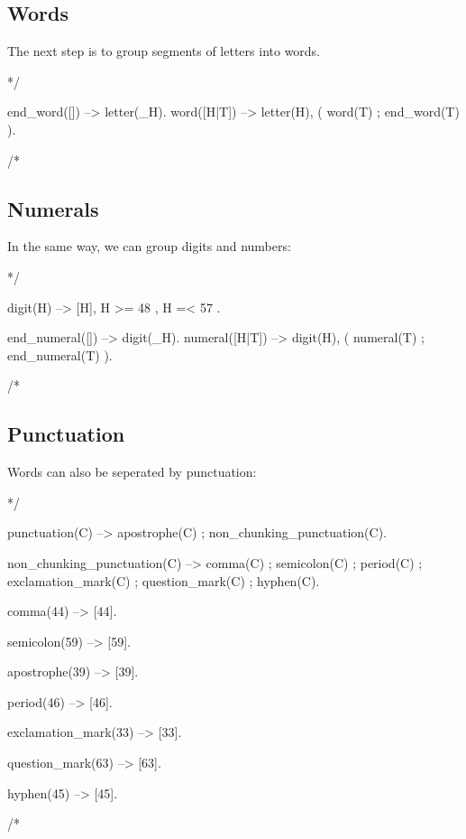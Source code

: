 \documentclass{book}[9pt]
\newenvironment{code}%
{\small \verbatim}%
{\endverbatim \large}
\begin{document}
\subsection{Words}

The next step is to group segments of letters into words.

\begin{code}
*/

end_word([]) --> \+ letter(_H).
word([H|T]) -->
        letter(H),
        ( word(T)
        ; end_word(T)
        ).


/*
\end{code}

\subsection{Numerals}

In the same way, we can group digits and numbers:

\begin{code}
*/

digit(H) -->
        [H],
        { H >= 48 },
        { H =< 57 }.

end_numeral([]) --> \+ digit(_H).
numeral([H|T]) -->
        digit(H),
        (
          numeral(T)
        ;
          end_numeral(T)
        ).

/*
\end{code}

\subsection{Punctuation}

Words can also be seperated by punctuation:

\begin{code}
*/

punctuation(C) -->
        apostrophe(C)
    ;
        non_chunking_punctuation(C).


non_chunking_punctuation(C) -->
        comma(C)
    ;
        semicolon(C)
    ;
        period(C)
    ;
        exclamation_mark(C)
    ;
        question_mark(C)
    ;
        hyphen(C).

comma(44) --> [44].

semicolon(59) --> [59].

apostrophe(39) --> [39].

period(46) --> [46].

exclamation_mark(33) --> [33].

question_mark(63) --> [63].

hyphen(45) --> [45].


/*
\end{code}
\end{document}
